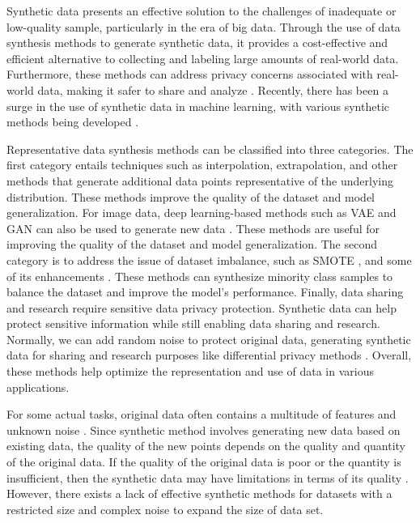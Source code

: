 \documentclass[sn-mathphys,Numbered]{sn-jnl}%
\theoremstyle{thmstyleone}%
\theoremstyle{thmstyletwo}%
\theoremstyle{thmstylethree}%
\begin{document}
Synthetic data presents an effective solution to the challenges of inadequate or low-quality sample, particularly in the era of big data. Through the use of data synthesis methods to generate synthetic data, it provides a cost-effective and efficient alternative to collecting and labeling large amounts of real-world data. Furthermore, these methods can address privacy concerns associated with real-world data, making it safer to share and analyze \cite{bib1}. Recently, there has been a surge in the use of synthetic data in machine learning, with various synthetic methods being developed \cite{bib2,bib3}.

Representative data synthesis methods can be classified into three categories. The first category entails techniques such as interpolation, extrapolation, and other methods \cite{bib4} that generate additional data points representative of the underlying distribution. These methods improve the quality of the dataset and model generalization. For image data, deep learning-based methods such as VAE and GAN can also be used to generate new data \cite{bib5,bib6}. These methods are useful for improving the quality of the dataset and model generalization. The second category is to address the issue of dataset imbalance, such as SMOTE \cite{bib7}, and some of its enhancements \cite{bib8,bib9,bib10}. These methods can synthesize minority class samples to balance the dataset and improve the model's performance. Finally, data sharing and research require sensitive data privacy protection. Synthetic data can help protect sensitive information while still enabling data sharing and research. Normally, we can add random noise to protect original data, generating synthetic data for sharing and research purposes like differential privacy methods \cite{bib11}. Overall, these methods help optimize the representation and use of data in various applications.

For some actual tasks, original data often contains a multitude of features and unknown noise \cite{bib12}. Since synthetic method involves generating new data based on existing data, the quality of the new points depends on the quality and quantity of the original data. If the quality of the original data is poor or the quantity is insufficient, then the synthetic data may have limitations in terms of its quality \cite{bib13}. However, there exists a lack of effective synthetic methods for datasets with a restricted size and complex noise to expand the size of data set.
\end{document}
